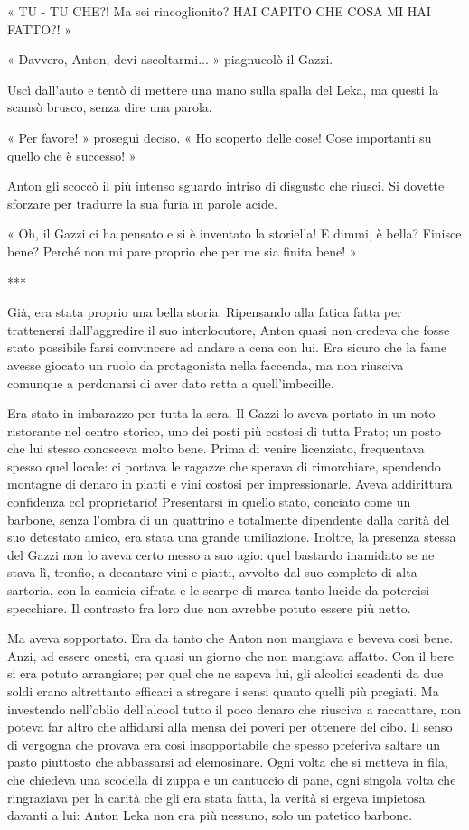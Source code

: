 « TU - TU CHE?! Ma sei rincoglionito? HAI CAPITO CHE COSA MI HAI FATTO?! »

« Davvero, Anton, devi ascoltarmi... » piagnucolò il Gazzi.

Uscì dall'auto e tentò di mettere una mano sulla spalla del Leka, ma questi la scansò brusco, senza dire una parola.

« Per favore! » proseguì deciso. « Ho scoperto delle cose! Cose importanti su quello che è successo! »

Anton gli scoccò il più intenso sguardo intriso di disgusto che riuscì. Si dovette sforzare per tradurre la sua furia in parole acide.

« Oh, il Gazzi ci ha pensato e si è inventato la storiella! E dimmi, è bella? Finisce bene? Perché non mi pare proprio che per me sia finita bene! »

***

Già, era stata proprio una bella storia. Ripensando alla fatica fatta per trattenersi dall'aggredire il suo interlocutore, Anton quasi non credeva che fosse stato possibile farsi convincere ad andare a cena con lui. Era sicuro che la fame avesse giocato un ruolo da protagonista nella faccenda, ma non riusciva comunque a perdonarsi di aver dato retta a quell'imbecille.

Era stato in imbarazzo per tutta la sera. Il Gazzi lo aveva portato in un noto ristorante nel centro storico, uno dei posti più costosi di tutta Prato; un posto che lui stesso conosceva molto bene. Prima di venire licenziato, frequentava spesso quel locale: ci portava le ragazze che sperava di rimorchiare, spendendo montagne di denaro in piatti e vini costosi per impressionarle. Aveva addirittura confidenza col proprietario! Presentarsi in quello stato, conciato come un barbone, senza l'ombra di un quattrino e totalmente dipendente dalla carità del suo detestato amico, era stata una grande umiliazione. Inoltre, la presenza stessa del Gazzi non lo aveva certo messo a suo agio: quel bastardo inamidato se ne stava lì, tronfio, a decantare vini e piatti, avvolto dal suo completo di alta sartoria, con la camicia cifrata e le scarpe di marca tanto lucide da potercisi specchiare. Il contrasto fra loro due non avrebbe potuto essere più netto.

Ma aveva sopportato. Era da tanto che Anton non mangiava e beveva così bene. Anzi, ad essere onesti, era quasi un giorno che non mangiava affatto. Con il bere si era potuto arrangiare; per quel che ne sapeva lui, gli alcolici scadenti da due soldi erano altrettanto efficaci a stregare i sensi quanto quelli più pregiati. Ma investendo nell'oblio dell'alcool tutto il poco denaro che riusciva a raccattare, non poteva far altro che affidarsi alla mensa dei poveri per ottenere del cibo. Il senso di vergogna che provava era così insopportabile che spesso preferiva saltare un pasto piuttosto che abbassarsi ad elemosinare. Ogni volta che si metteva in fila, che chiedeva una scodella di zuppa e un cantuccio di pane, ogni singola volta che ringraziava per la carità che gli era stata fatta, la verità si ergeva impietosa davanti a lui: Anton Leka non era più nessuno, solo un patetico barbone.


